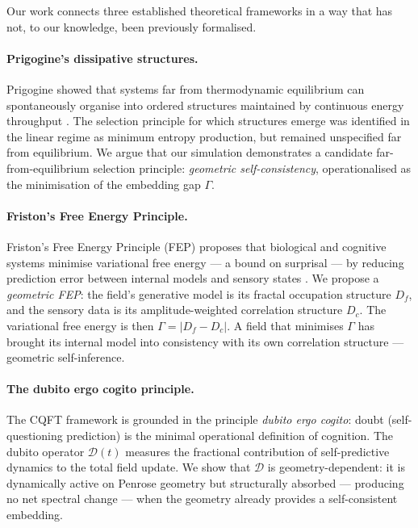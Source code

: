 \documentclass[12pt,a4paper]{article}
\theoremstyle{plain}
\theoremstyle{definition}
\begin{document}
Our work connects three established theoretical frameworks in a way that
has not, to our knowledge, been previously formalised.

\paragraph{Prigogine's dissipative structures.}
Prigogine showed that systems far from thermodynamic equilibrium can
spontaneously organise into ordered structures maintained by continuous
energy throughput \citep{prigogine1977}. The selection principle for which
structures emerge was identified in the linear regime as minimum entropy
production, but remained unspecified far from equilibrium. We argue that
our simulation demonstrates a candidate far-from-equilibrium selection
principle: \emph{geometric self-consistency}, operationalised as the
minimisation of the embedding gap $\Gamma$.

\paragraph{Friston's Free Energy Principle.}
Friston's Free Energy Principle (FEP) proposes that biological and cognitive
systems minimise variational free energy --- a bound on surprisal --- by reducing
prediction error between internal models and sensory states
\citep{friston2010,friston2019}. We propose a \emph{geometric FEP}: the
field's generative model is its fractal occupation structure $D_f$, and the
sensory data is its amplitude-weighted correlation structure $D_c$. The
variational free energy is then $\Gamma = |D_f - D_c|$. A field that
minimises $\Gamma$ has brought its internal model into consistency with its
own correlation structure --- geometric self-inference.

\paragraph{The dubito ergo cogito principle.}
The CQFT framework is grounded in the principle \emph{dubito ergo cogito}:
doubt (self-questioning prediction) is the minimal operational definition
of cognition. The dubito operator $\mathcal{D}(t)$ measures the fractional
contribution of self-predictive dynamics to the total field update. We show
that $\mathcal{D}$ is geometry-dependent: it is dynamically active on
Penrose geometry but structurally absorbed --- producing no net spectral
change --- when the geometry already provides a self-consistent embedding.
\end{document}
